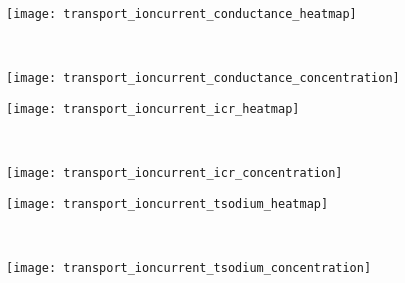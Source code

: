 %
\begin{figure*}[p]
  \centering

  \begin{minipage}[t]{3.75cm}
    \begin{subfigure}[t]{3.75cm}
      \centering
      \caption{}\vspace{0mm}\label{fig:transport_ioncurrent_conductance_heatmap}
      \texttt{[image: transport\_ioncurrent\_conductance\_heatmap]}
    \end{subfigure}
    \\
    \begin{subfigure}[t]{3.75cm}
      \centering
      \caption{}\vspace{0mm}\label{fig:transport_ioncurrent_conductance_concentration}
      \texttt{[image: transport\_ioncurrent\_conductance\_concentration]}
    \end{subfigure}
  \end{minipage}
  \hspace{-2.5mm}
  \begin{minipage}[t]{3.75cm}
    \begin{subfigure}[t]{3.75cm}
      \centering
      \caption{}\vspace{0mm}\label{fig:transport_ioncurrent_icr_heatmap}
      \texttt{[image: transport\_ioncurrent\_icr\_heatmap]}
    \end{subfigure}
    \\
    \begin{subfigure}[t]{3.75cm}
      \centering
      \caption{}\vspace{0mm}\label{fig:transport_ioncurrent_icr_concentration}
      \texttt{[image: transport\_ioncurrent\_icr\_concentration]}
    \end{subfigure}
  \end{minipage}
  \hspace{-2.5mm}
  \begin{minipage}[t]{3.75cm}
    \begin{subfigure}[t]{3.75cm}
      \centering
      \caption{}\vspace{0mm}\label{fig:transport_ioncurrent_tsodium_heatmap}
      \texttt{[image: transport\_ioncurrent\_tsodium\_heatmap]}
    \end{subfigure}
    \\
    \begin{subfigure}[t]{3.75cm}
      \centering
      \caption{}\vspace{0mm}\label{fig:transport_ioncurrent_tsodium_concentration}
      \texttt{[image: transport\_ioncurrent\_tsodium\_concentration]}
    \end{subfigure}
  \end{minipage}


\end{figure*}
